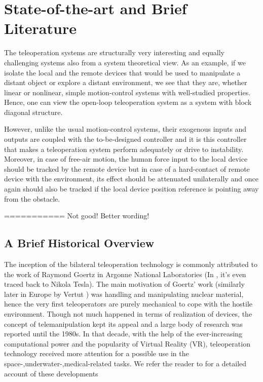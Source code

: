 \chapter{State-of-the-art and Brief Literature}
\label{chap:thatchapter}

The teleoperation systems are structurally very interesting and equally challenging systems also from a system theoretical view. As an example, if we isolate the local and the remote devices that would be used to manipulate a distant object or explore a distant environment, we see that they are, whether linear or nonlinear, simple motion-control systems with well-studied properties. Hence, one can view the open-loop teleoperation system as a system with block diagonal structure. 

However, unlike the usual motion-control systems, their exogenous inputs and outputs are coupled with the to-be-designed controller and it is this controller that makes a teleoperation system perform adequately or drive to instability. Moreover, in case of free-air motion, the human force input to the local device should be tracked by the remote device but in case of a hard-contact of remote device with the environment, its effect should be attenuated unilaterally and once again should also be tracked if the local device position reference is pointing away from the obstacle. 



=========== Not good! Better wording!

\section{A Brief Historical Overview}

The inception of the bilateral teleoperation technology is commonly attributed to the work 
of Raymond Goertz in Argonne National Laboratories \cite{goertz} (In \cite{basanezsuarez}, 
it's even traced back to Nikola Tesla). The main motivation of Goertz' work (similarly later in Europe 
by Vertut \cite{vertutcoiffet}) was handling and manipulating nuclear material, hence the very 
first teleoperators are purely mechanical to cope with the hostile environment. Though not much 
happened in terms of realization of devices, the concept of telemanipulation kept its appeal 
and a large body of research was reported until the 1980s. In that decade, with the help of the 
ever-increasing computational power and the popularity of Virtual Reality (VR), teleoperation 
technology received more attention for a possible use in the space-,underwater-,medical-related tasks. We refer 
the reader to \cite{burdea} for a detailed account of these developments 

